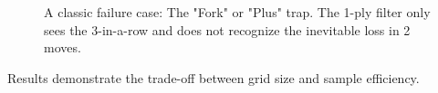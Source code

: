 \documentclass[9pt,a4paper,twocolumn,twoside]{rho-class/rho}
\begin{document}
        \begin{figure}[h]
            \centering
            \caption{A classic failure case: The "Fork" or "Plus" trap. The 1-ply filter only sees the 3-in-a-row and does not recognize the inevitable loss in 2 moves.}
            \label{fig:fail_case}
        \end{figure}
    Results demonstrate the trade-off between grid size and sample efficiency.
\end{document}
